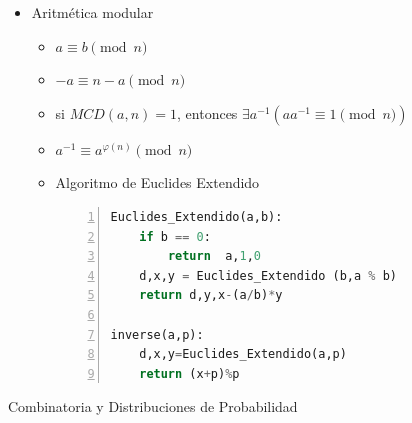 \documentclass[a4paper,spanish,10pt]{article}
\begin{document}
\begin{itemize}
{
		}
		\item{
			Aritm\'etica modular
			\begin{itemize}
				\item $a \equiv b \pmod{n}$ 
				\item $-a \equiv n-a \pmod{n}$
				\item si $MCD(a,n)=1$, entonces $\exists a^{-1}(aa^{-1}\equiv 1 \pmod{n})$
				\item $a^{-1}\equiv a^{\varphi(n)} \pmod{n}$
				\item{
					Algoritmo de Euclides Extendido
					\begin{lstlisting}[language=python, numbers=left,tabsize=4]
Euclides_Extendido(a,b):
	if b == 0:
		return  a,1,0
	d,x,y = Euclides_Extendido (b,a % b)
	return d,y,x-(a/b)*y

inverse(a,p):
	d,x,y=Euclides_Extendido(a,p)
	return (x+p)%p
					\end{lstlisting}
				}
			\end{itemize}
		}
	\end{itemize}
	\newpage
	Combinatoria y Distribuciones de Probabilidad\\
\end{document}
